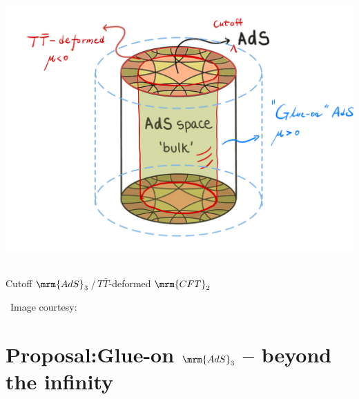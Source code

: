 \documentclass[10pt]{article}
\newcommand{\citations}[1]{{\footnotesize#1\par}}
\newcommand{\TTbar}{\texorpdfstring{\ensuremath{T\bar{T}}}{TTbar}\xspace}
\begin{document}
\begin{multicols}{3}
\vspace*{-4\baselineskip}
\begin{center}
	\mbox{
		\hspace{-2.6em}
		\includegraphics[width=1.17\linewidth]{img/ads-cft-cutoff.png}
	}
	
	\vspace{-.9\baselineskip}\small
	Cutoff $\mrm{AdS}_3$\,/\,\TTbar-deformed $\mrm{CFT}_2$

	\vspace{-.3\baselineskip}
	\scriptsize\ Image courtesy: \textcite{AldegundePWSep22}
\end{center}


%
%
%
%

\vspace{-1.5\baselineskip}

\section*{\textbf{Proposal:}\texstringonly{\\}Glue-on $\mrm{AdS}_3$ -- beyond the infinity}
\label{se:glueonproposal}


\end{multicols}
\end{document}
